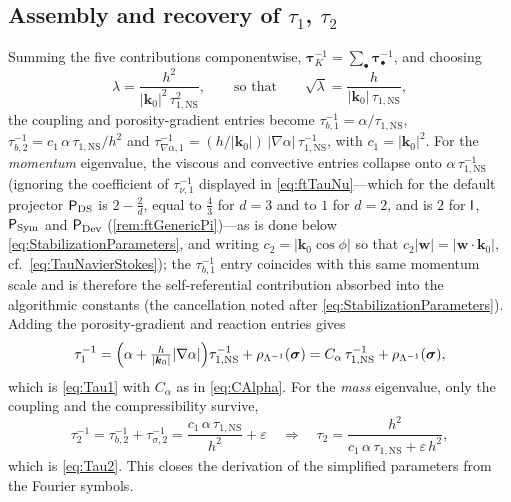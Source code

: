\subsection{Assembly and recovery of \texorpdfstring{$\tau_1$, $\tau_2$}{tau1, tau2}}\label{sec:ftAssembly}
Summing the five contributions componentwise, $\boldsymbol{\tau}_K^{-1}=\sum_\bullet\boldsymbol{\tau}_\bullet^{-1}$, and choosing
\begin{equation}\label{eq:ftLambda}
  \lambda = \frac{h^2}{|\boldsymbol{k}_0|^2\,\tau_{1,\mathrm{NS}}^2},
  \qquad\text{so that}\qquad
  \sqrt{\lambda} = \frac{h}{|\boldsymbol{k}_0|\,\tau_{1,\mathrm{NS}}},
\end{equation}
the coupling and porosity-gradient entries become $\tau_{b,1}^{-1}=\alpha/\tau_{1,\mathrm{NS}}$, $\tau_{b,2}^{-1}=c_1\,\alpha\,\tau_{1,\mathrm{NS}}/h^2$ and $\tau_{\nabla\alpha,1}^{-1}=(h/|\boldsymbol{k}_0|)\,|\nabla\alpha|\,\tau_{1,\mathrm{NS}}^{-1}$, with $c_1=|\boldsymbol{k}_0|^2$. For the \emph{momentum} eigenvalue, the viscous and convective entries collapse onto $\alpha\,\tau_{1,\mathrm{NS}}^{-1}$ (ignoring the coefficient of $\tau_{\nu,1}^{-1}$ displayed in \cref{eq:ftTauNu}---which for the default projector $\mathsf{P}_{\mathrm{DS}}$ is $2-\tfrac2d$, equal to $\tfrac43$ for $d=3$ and to $1$ for $d=2$, and is $2$ for $\mathsf{I}$, $\mathsf{P}_{\mathrm{Sym}}$ and $\mathsf{P}_{\mathrm{Dev}}$ (\cref{rem:ftGenericPi})---as is done below \cref{eq:StabilizationParameters}, and writing $c_2=|\boldsymbol{k}_0\cos\phi|$ so that $c_2|\boldsymbol{w}|=|\boldsymbol{w}\cdot\boldsymbol{k}_0|$, cf.\ \cref{eq:TauNavierStokes}); the $\tau_{b,1}^{-1}$ entry coincides with this same momentum scale and is therefore the self-referential contribution absorbed into the algorithmic constants (the cancellation noted after \cref{eq:StabilizationParameters}). Adding the porosity-gradient and reaction entries gives
\begin{equation}\label{eq:ftTau1}
  \tau_1^{-1}
   = \Bigl(\alpha + \tfrac{h}{|\boldsymbol{k}_0|}|\nabla\alpha|\Bigr)\tau_{1,\mathrm{NS}}^{-1} + \rho_{\Lambda^{-1}}(\boldsymbol{\sigma})
   = C_\alpha\,\tau_{1,\mathrm{NS}}^{-1} + \rho_{\Lambda^{-1}}(\boldsymbol{\sigma}),
\end{equation}
which is \cref{eq:Tau1} with $C_\alpha$ as in \cref{eq:CAlpha}. For the \emph{mass} eigenvalue, only the coupling and the compressibility survive,
\begin{equation}\label{eq:ftTau2}
  \tau_2^{-1} = \tau_{b,2}^{-1} + \tau_{\sigma,2}^{-1} = \frac{c_1\,\alpha\,\tau_{1,\mathrm{NS}}}{h^2} + \varepsilon
  \quad\Longrightarrow\quad
  \tau_2 = \frac{h^2}{c_1\,\alpha\,\tau_{1,\mathrm{NS}} + \varepsilon\,h^2},
\end{equation}
which is \cref{eq:Tau2}. This closes the derivation of the simplified parameters from the Fourier symbols.
